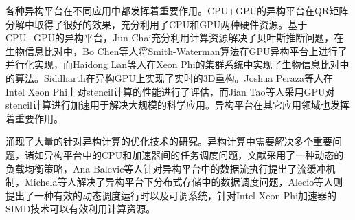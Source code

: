 各种异构平台在不同应用中都发挥着重要作用。CPU+GPU的异构平台在QR矩阵分解中取得了很好的效果，充分利用了CPU和GPU两种硬件资源。基于CPU+GPU的异构平台，Jun Chai充分利用计算资源解决了贝叶斯推断问题，在生物信息比对中，Bo Chen等人将Smith-Waterman算法在GPU异构平台上进行了并行化实现，而Haidong Lan等人在Xeon Phi的集群系统中实现了生物信息比对中的算法。Siddharth在异构GPU上实现了实时的3D重构。Joshua Peraza等人在Intel Xeon Phi上对stencil计算的性能进行了评估，而Jian Tao等人采用GPU对stencil计算进行加速用于解决大规模的科学应用。异构平台在其它应用领域也发挥着重要作用。

涌现了大量的针对异构计算的优化技术的研究。异构计算中需要解决多个重要问题，诸如异构平台中的CPU和加速器间的任务调度问题，文献采用了一种动态的负载均衡策略，Ana Balevic等人针对异构平台中的数据流执行提出了流缓冲机制，Michela等人解决了异构平台下分布式存储中的数据调度问题，Alecio等人则提出了一种有效的动态调度运行时以及可调系统，针对Intel Xeon Phi加速器的SIMD技术可以有效利用计算资源。

